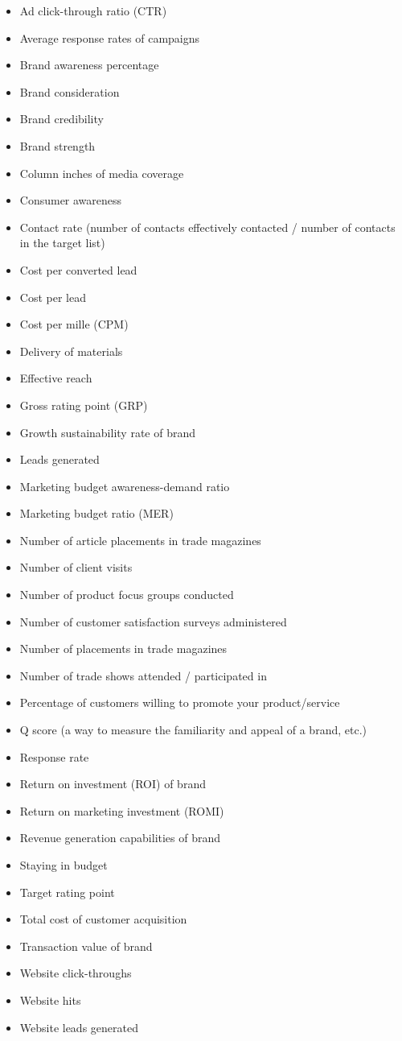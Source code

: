 \documentclass[]{book}
\providecommand{\tightlist}{%
  \setlength{\itemsep}{0pt}\setlength{\parskip}{0pt}}
\begin{document}
\begin{itemize}
\tightlist
\item
  Ad click-through ratio (CTR)
\item
  Average response rates of campaigns
\item
  Brand awareness percentage
\item
  Brand consideration
\item
  Brand credibility
\item
  Brand strength
\item
  Column inches of media coverage
\item
  Consumer awareness
\item
  Contact rate (number of contacts effectively contacted / number of
  contacts in the target list)
\item
  Cost per converted lead
\item
  Cost per lead
\item
  Cost per mille (CPM)
\item
  Delivery of materials
\item
  Effective reach
\item
  Gross rating point (GRP)
\item
  Growth sustainability rate of brand
\item
  Leads generated
\item
  Marketing budget awareness-demand ratio
\item
  Marketing budget ratio (MER)
\item
  Number of article placements in trade magazines
\item
  Number of client visits
\item
  Number of product focus groups conducted
\item
  Number of customer satisfaction surveys administered
\item
  Number of placements in trade magazines
\item
  Number of trade shows attended / participated in
\item
  Percentage of customers willing to promote your product/service
\item
  Q score (a way to measure the familiarity and appeal of a brand, etc.)
\item
  Response rate
\item
  Return on investment (ROI) of brand
\item
  Return on marketing investment (ROMI)
\item
  Revenue generation capabilities of brand
\item
  Staying in budget
\item
  Target rating point
\item
  Total cost of customer acquisition
\item
  Transaction value of brand
\item
  Website click-throughs
\item
  Website hits
\item
  Website leads generated
\end{itemize}
\end{document}
